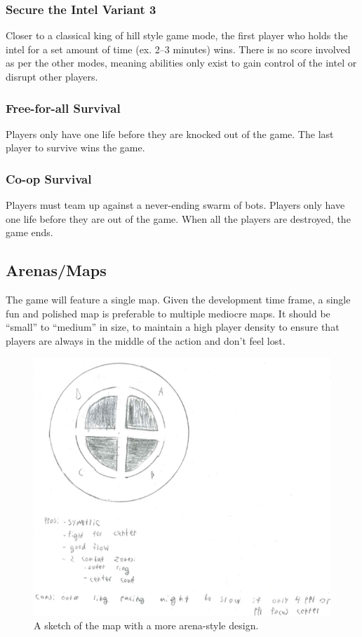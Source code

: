 \documentclass{article}
\theoremstyle{definition}
\begin{document}
\subsubsection{Secure the Intel Variant 3}

Closer to a classical king of hill style game mode, the first player who holds
the intel for a set amount of time (ex. 2--3 minutes) wins. There is no score
involved as per the other modes, meaning abilities only exist to gain control
of the intel or disrupt other players.

\subsubsection{Free-for-all Survival}

Players only have one life before they are knocked out of the game. The last
player to survive wins the game.

\subsubsection{Co-op Survival}

Players must team up against a never-ending swarm of bots. Players only have
one life before they are out of the game. When all the players are destroyed,
the game ends.

\subsection{Arenas/Maps}

The game will feature a single map. Given the development time frame, a single
fun and polished map is preferable to multiple mediocre maps. It should be
``small'' to ``medium'' in size, to maintain a high player density to ensure
that players are always in the middle of the action and don't feel lost.

\begin{figure}[htpb]
  \centering
  \includegraphics[width=0.8\linewidth]{austin_map2.png}
  \caption{A sketch of the map with a more arena-style design.}
\label{fig:austin_map1}
\end{figure}
\end{document}
